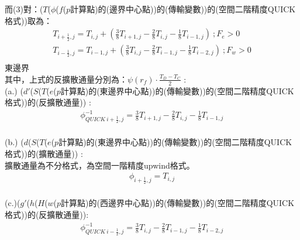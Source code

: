 \documentclass[12pt]{article}
\begin{document}
\noindent 而(3)對：($T$($\phi$($f$($p$計算點)的(邊界中心點))的(傳輸變數))的(空間二階精度QUICK格式))取為：\\
\begin{equation}
    \begin{split}
        T_{i+\frac{1}{2},j} = T_{i,j} + (\frac{3}{8}T_{i+1,j} - \frac{2}{8}T_{i,j} - \frac{1}{8}T_{i-1,j})\ ; F_{e} > 0 \\
        T_{i-\frac{1}{2},j} = T_{i-1,j} + (\frac{3}{8}T_{i,j} - \frac{2}{8}T_{i-1,j} - \frac{1}{8}T_{i-2,j})\ ; F_{w} > 0 \\
    \end{split}
\end{equation}
\noindent 東邊界\\
\noindent 其中，上式的反擴散通量分別為：$\psi(r_f)\cdot \frac{T_{D} - T_{C}}{2}$ : \\
\noindent (a.) ($d'$($S$($T$($e$($p$計算點)的(東邊界中心點))的(傳輸變數))的(空間二階精度QUICK格式))的(反擴散通量)) : \\
\begin{equation}
    \begin{split}
        \phi_{QUICK\ i+\frac{1}{2},j}^{-1} = \frac{3}{8}T_{i+1,j} - \frac{2}{8}T_{i,j} - \frac{1}{8}T_{i-1,j} \\
    \end{split}
\end{equation}

\noindent (b.) ($d$($S$($T$($e$($p$計算點)的(東邊界中心點))的(傳輸變數))的(空間二階精度QUICK格式))的(擴散通量)) : \\
\noindent *擴散通量為不分格式，為空間一階精度upwind格式。\\
\begin{equation}
    \begin{split}
        \phi_{ i+\frac{1}{2},j}= T_{i,j} \\
    \end{split}
\end{equation}

\noindent (c.)($g'$($h$($H$($w$($p$計算點)的(西邊界中心點))的(傳輸變數))的(空間二階精度QUICK格式))的(反擴散通量)):\\
\begin{equation}
    \begin{split}
        \phi_{QUICK\ i-\frac{1}{2},j}^{-1} = \frac{3}{8}T_{i,j} - \frac{2}{8}T_{i-1,j} - \frac{1}{8}T_{i-2,j} \\
    \end{split}
\end{equation}
\end{document}
